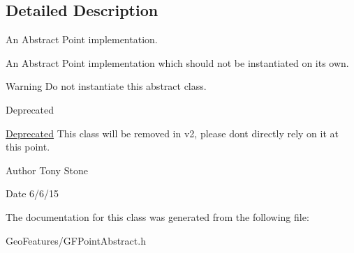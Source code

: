 \subsection{Detailed Description}
An Abstract Point implementation. 

An Abstract Point implementation which should not be instantiated on it\textquotesingle{}s own.

\begin{DoxyWarning}{Warning}
Do not instantiate this abstract class.
\end{DoxyWarning}
\begin{DoxyRefDesc}{Deprecated}
\item[\hyperlink{deprecated__deprecated000002}{Deprecated}]This class will be removed in v2, please don\textquotesingle{}t directly rely on it at this point.\end{DoxyRefDesc}


\begin{DoxyAuthor}{Author}
Tony Stone 
\end{DoxyAuthor}
\begin{DoxyDate}{Date}
6/6/15 
\end{DoxyDate}


The documentation for this class was generated from the following file\+:\begin{DoxyCompactItemize}
\item 
Geo\+Features/G\+F\+Point\+Abstract.\+h\end{DoxyCompactItemize}
